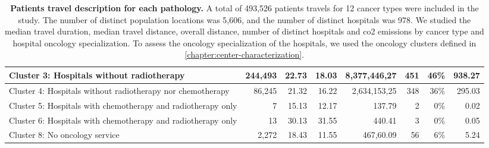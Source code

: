\begin{table}[h]
{\begin{tabular}{|l|r|r|r|r|r|r|r|}
            Cluster 3: Hospitals without radiotherapy                                        & 244,493          & 22.73                    & 18.03                    & 8,377,446,27            & 451                  & 46\%                  & 938.27                      \\ \hline
            Cluster 4: Hospitals without radiotherapy nor chemotherapy                       & 86,245           & 21.32                    & 16.22                    & 2,634,153,25            & 348                  & 36\%                  & 295.03                      \\ \hline
            Cluster 5: Hospitals with chemotherapy and radiotherapy only                     & 7                & 15.13                    & 12.17                    & 137.79                  & 2                    & 0\%                   & 0.02                        \\ \hline
            Cluster 6: Hospitals with chemotherapy and radiotherapy only                     & 13               & 30.13                    & 31.55                    & 440.41                  & 3                    & 0\%                   & 0.05                        \\ \hline
            Cluster 8: No oncology service                                                   & 2,272            & 18.43                    & 11.55                    & 467,60.09               & 56                   & 6\%                   & 5.24                        \\ \hline
        \end{tabular}
    } \caption{ \textbf{Patients travel description for each pathology.} A total
        of 493,526 patients travels for 12 cancer types were included in the study.
        The number of distinct population locations was 5,606, and the number of
        distinct hospitals was 978. We studied the median travel duration,
        median travel distance, overall distance, number of distinct hospitals and
        \ac{co2} emissions by cancer type and hospital oncology specialization. To
        assess the oncology specialization of the hospitals, we used the oncology
        clusters defined in \cref{chapter:center-characterization}.}
    \label{table:distance_and_co2}
\end{table}

